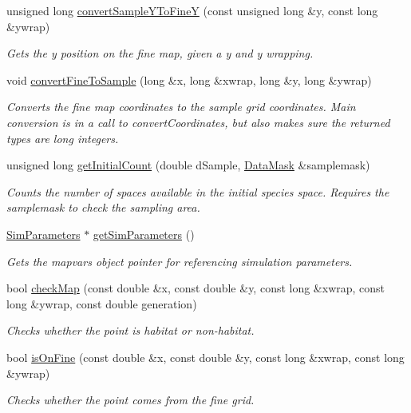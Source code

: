 \begin{DoxyCompactItemize}
unsigned long \hyperlink{class_landscape_a20bce25a388ec094f4c3fa8600c22545}{convert\+Sample\+Y\+To\+FineY} (const unsigned long \&y, const long \&ywrap)
\begin{DoxyCompactList}\small\item\em Gets the y position on the fine map, given a y and y wrapping. \end{DoxyCompactList}\item 
void \hyperlink{class_landscape_a33e5909b7d430caf0f4fb909ba3e0499}{convert\+Fine\+To\+Sample} (long \&x, long \&xwrap, long \&y, long \&ywrap)
\begin{DoxyCompactList}\small\item\em Converts the fine map coordinates to the sample grid coordinates. Main conversion is in a call to convert\+Coordinates, but also makes sure the returned types are long integers. \end{DoxyCompactList}\item 
unsigned long \hyperlink{class_landscape_ae8d533d9a8fff3a96c240aadaeac3f04}{get\+Initial\+Count} (double d\+Sample, \hyperlink{class_data_mask}{Data\+Mask} \&samplemask)
\begin{DoxyCompactList}\small\item\em Counts the number of spaces available in the initial species space. Requires the samplemask to check the sampling area. \end{DoxyCompactList}\item 
\hyperlink{struct_sim_parameters}{Sim\+Parameters} $\ast$ \hyperlink{class_landscape_a679bb7a577f9404093b5aa8d17ba049e}{get\+Sim\+Parameters} ()
\begin{DoxyCompactList}\small\item\em Gets the mapvars object pointer for referencing simulation parameters. \end{DoxyCompactList}\item 
bool \hyperlink{class_landscape_a24de83f1e8f762b9640cdba35793a404}{check\+Map} (const double \&x, const double \&y, const long \&xwrap, const long \&ywrap, const double generation)
\begin{DoxyCompactList}\small\item\em Checks whether the point is habitat or non-\/habitat. \end{DoxyCompactList}\item 
bool \hyperlink{class_landscape_a92cd54efe4722ee0c40434875043d6c7}{is\+On\+Fine} (const double \&x, const double \&y, const long \&xwrap, const long \&ywrap)
\begin{DoxyCompactList}\small\item\em Checks whether the point comes from the fine grid. \end{DoxyCompactList}\item 

\end{DoxyCompactItemize}
